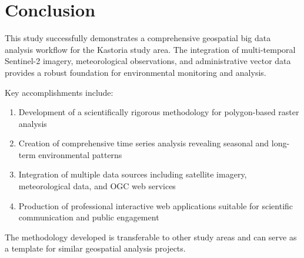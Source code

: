 \documentclass[a4paper,12pt]{article}
\begin{document}
\section{Conclusion}

This study successfully demonstrates a comprehensive geospatial big data
analysis workflow for the Kastoria study area. The integration of
multi-temporal Sentinel-2 imagery, meteorological observations, and
administrative vector data provides a robust foundation for environmental
monitoring and analysis.

Key accomplishments include:

\begin{enumerate}
    \item Development of a scientifically rigorous methodology for polygon-based raster
          analysis
    \item Creation of comprehensive time series analysis revealing seasonal and long-term
          environmental patterns
    \item Integration of multiple data sources including satellite imagery,
          meteorological data, and OGC web services
    \item Production of professional interactive web applications suitable for scientific
          communication and public engagement
\end{enumerate}

The methodology developed is transferable to other study areas and can serve as
a template for similar geospatial analysis projects.
\end{document}
